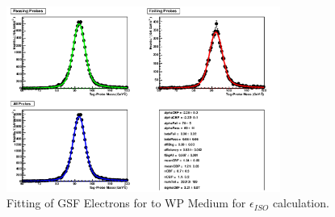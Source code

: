 \begin{figure}[htb]
\centering
\includegraphics[width=0.8\textwidth]{Systematics/2012data_outputGsfElectronToId.png}
\caption{Fitting of GSF Electrons for to WP Medium for $\epsilon_{ISO}$ calculation.}
\label{fig:2012data_outputGsfElectronToId}
\end{figure}



